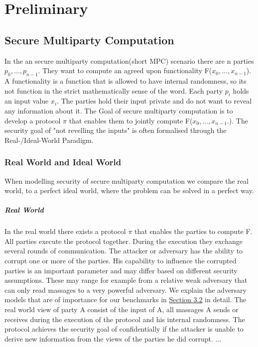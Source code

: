 \chapter{Preliminary}
\section{Secure Multiparty Computation}
In the an secure multiparty computation(short MPC) scenario there are n parties $ p_0,\dots,p_{n-1} $. They want to compute an agreed upon functionality F($ x_0,\dots,x_{n-1} $). A functionality is a function that is allowed to have internal randomness, so its not function in the strict mathematically sense of the word. 
Each party $ p_i $ holds an input value $ x_i $. 
The parties hold their input private and do not want to reveal any information about it. The Goal of secure multiparty computation is to develop a protocol  $ \pi $ that enables them to jointly compute F($ x_0,\dots,x_{n-1}. $). The security goal of "not revelling the inputs" is often formalised through the Real-/Ideal-World Paradigm. 


\subsection{Real World and Ideal World}
When modelling security of secure multiparty computation we compare the real world, to a perfect ideal world, where the problem can be solved in a perfect way.
\paragraph{Real World}
In the real world there exists a protocol $\pi $ that enables the parties to compute F. All parties execute the protocol together. During the execution they exchange several rounds of communication. The attacker or adversary has the ability to corrupt one or more of the parties. His capability to influence the corrupted parties is an important parameter and may differ based on different security assumptions. These may range for example from a relative weak adversary that can only read massages to a very powerful adversary. We explain the adversary models that are of importance for our benchmarks in \hyperref[sec:Adversarial Models]{Section 3.2} in detail.
The real world view of party A consist of the input of A, all massages A sends or receives during the execution of the protocol and his internal randomness. The protocol achieves the security goal of confidentially if the attacker is unable to derive new information from the views of the parties he did corrupt. ...

